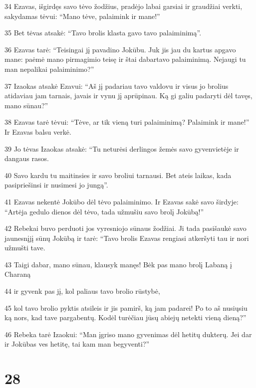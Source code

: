 \par 34 Ezavas, išgirdęs savo tėvo žodžius, pradėjo labai garsiai ir graudžiai verkti, sakydamas tėvui: “Mano tėve, palaimink ir mane!” 
\par 35 Bet tėvas atsakė: “Tavo brolis klasta gavo tavo palaiminimą”. 
\par 36 Ezavas tarė: “Teisingai jį pavadino Jokūbu. Juk jis jau du kartus apgavo mane: paėmė mano pirmagimio teisę ir štai dabar­tavo palaiminimą. Nejaugi tu man nepalikai palaiminimo?” 
\par 37 Izaokas atsakė Ezavui: “Aš jį padariau tavo valdovu ir visus jo brolius atidaviau jam tarnais, javais ir vynu jį aprūpinau. Ką gi galiu padaryti dėl tavęs, mano sūnau?” 
\par 38 Ezavas tarė tėvui: “Tėve, ar tik vieną turi palaiminimą? Palaimink ir mane!” Ir Ezavas balsu verkė. 
\par 39 Jo tėvas Izaokas atsakė: “Tu neturėsi derlingos žemės savo gyvenvietėje ir dangaus rasos. 
\par 40 Savo kardu tu maitinsies ir savo broliui tarnausi. Bet ateis laikas, kada pasipriešinsi ir nusimesi jo jungą”. 
\par 41 Ezavas nekentė Jokūbo dėl tėvo palaiminimo. Ir Ezavas sakė savo širdyje: “Artėja gedulo dienos dėl tėvo, tada užmušiu savo brolį Jokūbą!” 
\par 42 Rebekai buvo perduoti jos vyresniojo sūnaus žodžiai. Ji tada pasišaukė savo jaunesnįjį sūnų Jokūbą ir tarė: “Tavo brolis Ezavas rengiasi atkeršyti tau ir nori užmušti tave. 
\par 43 Taigi dabar, mano sūnau, klausyk manęs! Bėk pas mano brolį Labaną į Charaną 
\par 44 ir gyvenk pas jį, kol paliaus tavo brolio rūstybė, 
\par 45 kol tavo brolio pyktis atsileis ir jis pamirš, ką jam padarei! Po to aš nusiųsiu ką nors, kad tave pargabentų. Kodėl turėčiau jūsų abiejų netekti vieną dieną?” 
\par 46 Rebeka tarė Izaokui: “Man įgriso mano gyvenimas dėl hetitų dukterų. Jei dar ir Jokūbas ves hetitę, tai kam man begyventi?”



\chapter{28}

